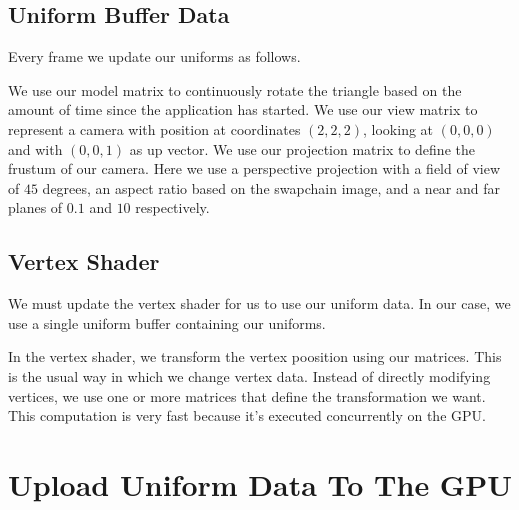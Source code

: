 \subsection{Uniform Buffer Data}

Every frame we update our uniforms as follows.

\begin{minipage}{\linewidth}{\noindent}
    
\end{minipage}

We use our model matrix to continuously rotate the triangle based on the
amount of time since the application has started.
We use our view matrix to represent a camera with position at coordinates
$(2, 2, 2)$, looking at $(0, 0, 0)$ and with $(0, 0, 1)$ as up vector.
We use our projection matrix to define the frustum of our camera.
Here we use a perspective projection with a field of view of $45$ degrees,
an aspect ratio based on the swapchain image, and a near and far planes of
$0.1$ and $10$ respectively.

\subsection{Vertex Shader}

We must update the vertex shader for us to use our uniform data.
In our case, we use a single uniform buffer containing our uniforms.

\begin{minipage}{\linewidth}{\noindent}
    
\end{minipage}

In the vertex shader, we transform the vertex poosition using our matrices.
This is the usual way in which we change vertex data.
Instead of directly modifying vertices, we use one or more matrices
that define the transformation we want.
This computation is very fast because it's executed concurrently on the GPU.

\section{Upload Uniform Data To The GPU}

